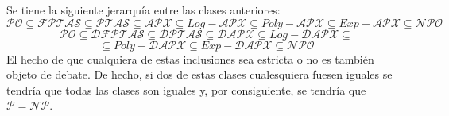 Se tiene la siguiente jerarquía entre las clases anteriores:
$$\mathcal{PO} \subseteq \mathcal{FPTAS} \subseteq \mathcal{PTAS} \subseteq \mathcal{APX} \subseteq Log-\mathcal{APX} \subseteq Poly-\mathcal{APX} \subseteq Exp-\mathcal{APX} \subseteq \mathcal{NPO}$$
$$\mathcal{PO} \subseteq \mathcal{DFPTAS} \subseteq \mathcal{DPTAS} \subseteq \mathcal{DAPX} \subseteq Log-\mathcal{DAPX} \subseteq$$ $$\subseteq Poly-\mathcal{DAPX} \subseteq Exp-\mathcal{DAPX} \subseteq \mathcal{NPO}$$
El hecho de que cualquiera de estas inclusiones sea estricta o no es también objeto de debate. De hecho, si dos de estas clases cualesquiera fuesen iguales se tendría que todas las clases son iguales y, por consiguiente, se tendría que $\mathcal{P} = \mathcal{NP}$.